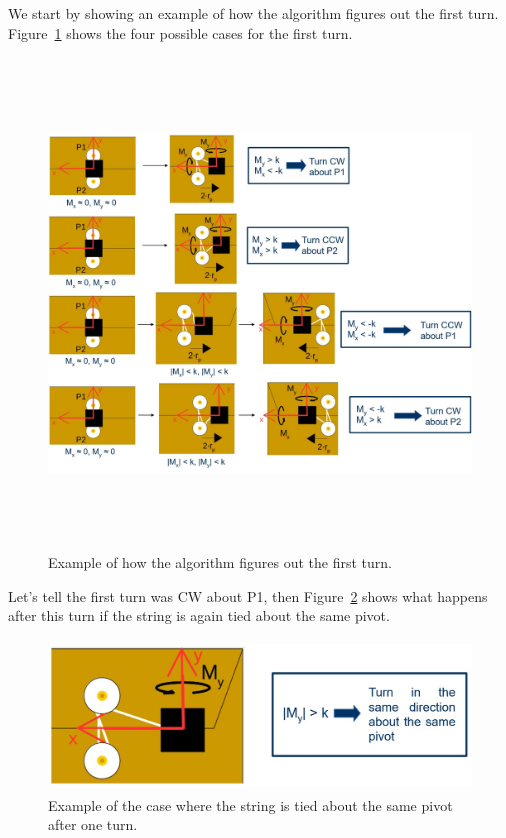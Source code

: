 We start by showing an example of how the algorithm figures out the first turn. Figure~\ref{fig:first_turn} shows the four possible cases for the first turn.
\begin{figure}[h!]
	\centering
	\includegraphics[height=130mm]{chapters/figures/algorithm/first_turn.jpg}
	\caption{Example of how the algorithm figures out the first turn.}
	\label{fig:first_turn}
\end{figure}

Let's tell the first turn was CW about P1, then Figure~\ref{fig:same_pivot} shows what happens after this turn if the string is again tied about the same pivot.
\begin{figure}[h!]
	\centering
	\includegraphics[height=40mm]{chapters/figures/algorithm/samepivot.jpg}
	\caption{Example of the case where the string is tied about the same pivot after one turn.}
	\label{fig:same_pivot}
\end{figure}

